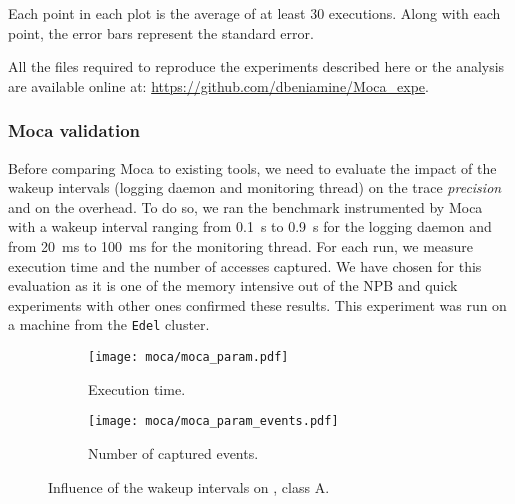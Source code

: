 Each point in each plot is the average of at least $30$ executions.
Along with each point, the error bars represent the standard error.

All the files required to reproduce the experiments described here or the analysis are available online at: \url{https://github.com/dbeniamine/Moca\_expe}.


\subsubsection{Moca validation}
\label{sec:expe-param}

Before comparing \gls{Moca} to existing tools, we need to evaluate the impact of the wakeup intervals (logging daemon and monitoring thread) on the trace \emph{precision} and on the overhead.
To do so, we ran the \IS benchmark instrumented by \gls{Moca} with a wakeup interval ranging from \SI{0.1}{s} to  \SI{0.9}{s} for the logging daemon and from \SI{20}{ms} to \SI{100}{ms} for the monitoring thread.
For each run, we measure \IS execution time and the number of accesses captured.
We have chosen \IS for this evaluation as it is one of the memory intensive out of the \gls{NPB} and quick experiments with other ones confirmed these results.
This experiment was run on a machine from the \texttt{Edel} cluster.

\begin{figure}[htb]
    \centering
    \begin{subfigure}{.73\linewidth}
        \texttt{[image: moca/moca\_param.pdf]}
        \caption{Execution time.}
        \label{fig:param_time}
    \end{subfigure}
    \begin{subfigure}{.73\linewidth}
        \texttt{[image: moca/moca\_param\_events.pdf]}
        \caption{Number of captured events.}
        \label{fig:param_evts}
    \end{subfigure}
    \caption[Influence of Moca wakeup intervals.]{Influence of the wakeup intervals on \IS, class A.}
    \label{fig:param}
\end{figure}

